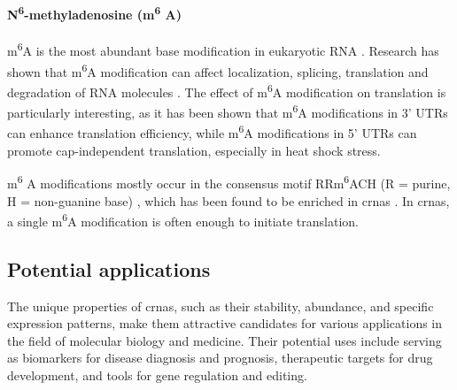 \paragraph{N\textsuperscript{6}-methyladenosine (m\textsuperscript{6}
    A)}  m\textsuperscript{6}A is the most abundant base modification in eukaryotic
RNA \supercite{yang_extensive_2017,li_pivotal_2014,wei_methylated_1975}.
Research has shown that m\textsuperscript{6}A modification can affect
localization, splicing, translation and degradation of RNA molecules
\supercite{yue_rna_2015,meyer_dynamic_2014}.
The effect of m\textsuperscript{6}A modification on translation is particularly
interesting, as it has been shown that m\textsuperscript{6}A modifications in
3' UTRs can enhance translation
efficiency\supercite{wang_n6-methyladenosine_2015}, while m\textsuperscript{6}A
modifications in 5' UTRs can promote cap-independent translation, especially in
heat shock stress\supercite{zhou_dynamic_2015,meyer_5_2015}.

m\textsuperscript{6}
A modifications mostly occur in the consensus motif RRm\textsuperscript{6}ACH
(R = purine, H = non-guanine base)
\supercite{csepany_sequence_1990,harper_sequence_1990}, which has been found to
be enriched in \gls{crna}s \supercite{yang_extensive_2017}.
In \gls{crna}s, a single m\textsuperscript{6}A modification is often enough to
initiate translation\supercite{yang_extensive_2017}.

\subsection{Potential applications}
\label{sec:circrna_applications}
The unique properties of \gls{crna}s, such as their stability, abundance, and
specific expression patterns, make them attractive candidates for various
applications in the field of molecular biology and medicine.
Their potential uses include serving as biomarkers for disease diagnosis and
prognosis, therapeutic targets for drug development, and tools for gene
regulation and editing.

